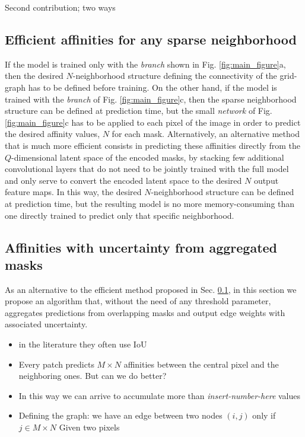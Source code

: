 Second contribution; two ways



\subsection{Efficient affinities for any sparse neighborhood}\label{sec:efficient_affs}
If the model is trained only with the \emph{\sparseBr branch} shown in Fig. \ref{fig:main_figure}a, then the desired $N$-neighborhood structure defining the connectivity of the grid-graph has to be defined before training. 
On the other hand, if the model is trained with the \emph{\encBr branch} of Fig. \ref{fig:main_figure}c, then the sparse neighborhood structure can be defined at prediction time, but the small \emph{\maskDec network} of Fig. \ref{fig:main_figure}c has to be applied to each pixel of the image in order to predict the desired affinity values, $N$ for each mask. 
Alternatively, an alternative method that is much more efficient consists in predicting these affinities directly from the $Q$-dimensional latent space of the encoded masks, by stacking few additional convolutional layers that do not need to be jointly trained with the full model and only serve to convert the encoded latent space to the desired $N$ output feature maps.
In this way, the desired $N$-neighborhood structure can be defined at prediction time, but the resulting model is no more memory-consuming than one directly trained to predict only that specific neighborhood. 



\subsection{Affinities with uncertainty from aggregated masks}\label{sec:aggr_affs}
As an alternative to the efficient method proposed in Sec. \ref{sec:efficient_affs}, in this section we propose an algorithm that, without the need of any threshold parameter, aggregates predictions from overlapping \maskname masks and output edge weights with associated uncertainty.
\begin{itemize}
\item in the literature they often use IoU
\item Every patch predicts $M\times N$ affinities between the central pixel and the neighboring ones. But can we do better?
\item In this way we can arrive to accumulate more than \emph{insert-number-here} values
\item Defining the graph: we have an edge between two nodes $(i, j)$ only if $j \in M\times N$ Given two pixels  
\end{itemize}

